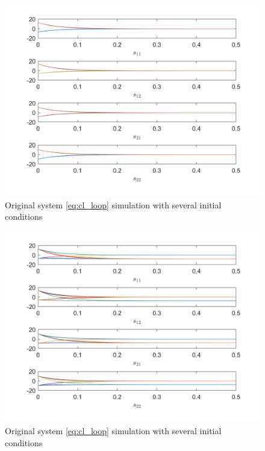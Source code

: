 \begin{figure}
    \centering
    \includegraphics[width=\textwidth]{text/analysis/fig/2by2monotone/s.png}
    \caption{Original system \eqref{eq:cl_loop} simulation with several initial conditions}
    \label{fig:s_mono_one}
\end{figure}
    
\begin{figure}
    \centering
    \includegraphics[width=\textwidth]{text/analysis/fig/2by2monotone/s_2.png}
    \caption{Original system \eqref{eq:cl_loop} simulation with several initial conditions}
    \label{fig:s_mono_two}
\end{figure}
        
    
